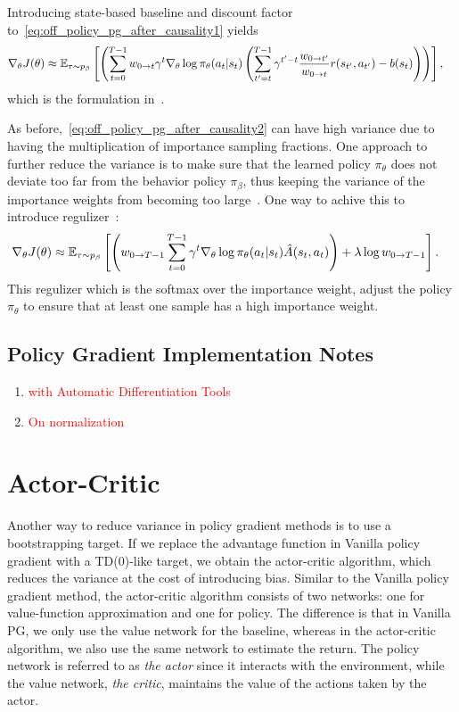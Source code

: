 \documentclass{article}
\begin{document}
Introducing state-based baseline and discount factor to~\eqref{eq:off_policy_pg_after_causality1} yields
\begin{align}
\nabla_\theta J(\theta) &\approx {\mathbb E}_{\tau \sim p_\beta} \left[\left(\sum_{t=0}^{T-1} w_{0\to t}\gamma^t \nabla_\theta \log \pi_\theta(a_t\vert s_t)  \left(\sum_{t^\prime=t}^{T-1} \gamma^{t^\prime - t}\frac{w_{{0} \to {t^\prime}}}{w_{{0} \to {t}}} r(s_{t^\prime}, a_{t^\prime}) - b(s_t)\right)\right) \right],\label{eq:off_policy_pg_after_causality2}
\end{align}
which is the formulation in~\cite{precup2000eligibility}.

As before,~\eqref{eq:off_policy_pg_after_causality2} can have high variance due to having the multiplication of importance sampling fractions.
One approach to further reduce the variance is to make sure that the learned policy $\pi_\theta$ does not deviate too far from the behavior policy $\pi_\beta$, thus keeping the variance of the importance weights from becoming too large~\cite{levine2020offline}.
One way to achive this to introduce regulizer~\cite{levine2013guided,levine2020offline}:
\begin{align*}
\nabla_\theta J(\theta) &\approx {\mathbb E}_{\tau \sim p_\beta} \left[\left( w_{{0} \to {T-1}} \sum_{t=0}^{T-1}\gamma^t \nabla_\theta \log \pi_\theta (a_t\vert s_t) \hat A(s_t,a_t)\right) + \lambda \log w_{{0} \to {T-1}}\right].
\end{align*}
This regulizer which is the softmax over the importance weight, adjust the policy $\pi_\theta$ to ensure that at least one sample has a high importance weight.

\subsection{Policy Gradient Implementation Notes}

\begin{enumerate}
    \item \textcolor{red}{with Automatic Differentiation Tools}
    \item \textcolor{red}{On normalization}
\end{enumerate}

\newpage
\section{Actor-Critic}

Another way to reduce variance in policy gradient methods is to use a bootstrapping target. If we replace the advantage function in Vanilla policy gradient with a TD(0)-like target, we obtain the actor-critic algorithm, which reduces the variance at the cost of introducing bias. Similar to the Vanilla policy gradient method, the actor-critic algorithm consists of two networks: one for value-function approximation and one for policy. The difference is that in Vanilla PG, we only use the value network for the baseline, whereas in the actor-critic algorithm, we also use the same network to estimate the return. The policy network is referred to as \textit{the actor} since it interacts with the environment, while the value network, \textit{the critic}, maintains the value of the actions taken by the actor.
\end{document}
